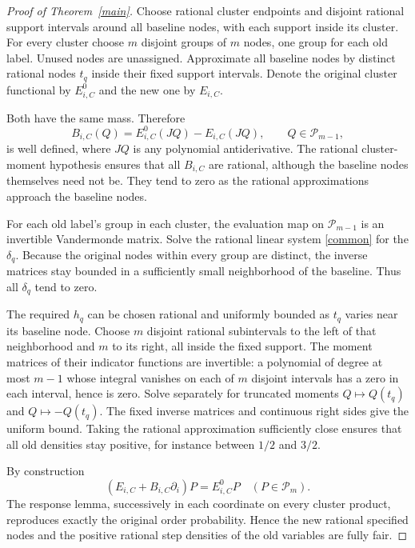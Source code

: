 \documentclass[11pt]{article}
\newcommand{\PP}{\mathcal P}
\begin{document}
\begin{proof}[Proof of Theorem~\ref{main}]
Choose rational cluster endpoints and disjoint rational support
intervals around all baseline nodes, with each support inside its
cluster. For every cluster choose $m$ disjoint groups of $m$ nodes,
one group for each old label. Unused nodes are unassigned.
Approximate all baseline nodes by distinct rational nodes $t_q$ inside
their fixed support intervals. Denote the original cluster functional
by $E^0_{i,C}$ and the new one by $E_{i,C}$.

Both have the same mass. Therefore
\begin{equation}\label{Bdef}
 B_{i,C}(Q)=E^0_{i,C}(JQ)-E_{i,C}(JQ),\qquad Q\in\PP_{m-1},
\end{equation}
is well defined, where $JQ$ is any polynomial antiderivative.
The rational cluster-moment hypothesis ensures that all $B_{i,C}$
are rational, although the baseline nodes themselves need not be.
They tend to zero as the rational approximations approach the
baseline nodes.

For each old label's group in each cluster, the evaluation map on
$\PP_{m-1}$ is an invertible Vandermonde matrix. Solve the rational
linear system \eqref{common} for the $\delta_q$. Because the original
nodes within every group are distinct, the inverse matrices stay
bounded in a sufficiently small neighborhood of the baseline.
Thus all $\delta_q$ tend to zero.

The required $h_q$ can be chosen rational and uniformly bounded as
$t_q$ varies near its baseline node. Choose $m$ disjoint rational
subintervals to the left of that neighborhood and $m$ to its right,
all inside the fixed support. The moment matrices of their indicator
functions are invertible: a polynomial of degree at most $m-1$
whose integral vanishes on each of $m$ disjoint intervals has a zero
in each interval, hence is zero. Solve separately for truncated
moments $Q\mapsto Q(t_q)$ and $Q\mapsto-Q(t_q)$. The fixed inverse
matrices and continuous right sides give the uniform bound.
Taking the rational approximation sufficiently close ensures that
all old densities stay positive, for instance between $1/2$ and $3/2$.

By construction
\[
 (E_{i,C}+B_{i,C}\partial_i)P=E^0_{i,C}P
 \quad(P\in\PP_m).
\]
The response lemma, successively in each coordinate on every cluster
product, reproduces exactly the original order probability. Hence the
new rational specified nodes and the positive rational step densities
of the old variables are fully fair.


\end{proof}
\end{document}
